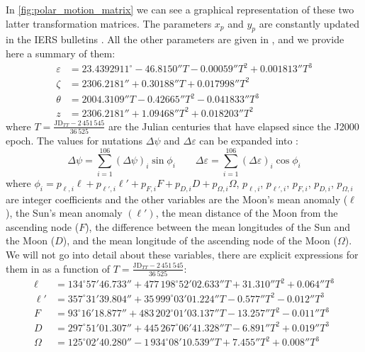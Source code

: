 \documentclass[../main.tex]{subfiles}
\begin{document}
In \cref{fig:polar_motion_matrix} we can see a graphical representation of these two latter transformation matrices. The parameters $x_p$ and $y_p$ are constantly updated in the IERS bulletins \cite{iersbulletinA}. All the other parameters are given in \cite{lieske}, and we provide here a summary of them:
\begin{align}
  \varepsilon & = 23.4392911^\circ -46.8150''T - 0.00059''T^2 + 0.001813''T^3 \\
  \zeta       & = 2306.2181''+ 0.30188''T + 0.017998''T^2                     \\
  \theta      & = 2004.3109''T- 0.42665''T^2 - 0.041833''T^3                  \\
  z           & = 2306.2181'' + 1.09468''T^2+0.018203''T^2
\end{align}
where $T=\frac{\text{JD}_{TT} - 2\,451\,545}{36\,525}$ are the Julian centuries that have elapsed since the J2000 epoch. The values for nutations $\Delta \psi$ and $\Delta \varepsilon$ can be expanded into \cite{montenbruck}:
\begin{equation}
  \Delta\psi = \sum_{i=1}^{106} {(\Delta\psi)}_i\sin \phi_i\qquad \Delta\varepsilon = \sum_{i=1}^{106} {(\Delta\varepsilon)}_i\cos \phi_i
\end{equation}
where $\phi_i=p_{\ell,i}\ell+ p_{\ell',i}\ell'+p_{F,i}F+p_{D,i}D+p_{\Omega,i}\Omega$, $p_{\ell,i}$, $p_{\ell',i}$, $p_{F,i}$, $p_{D,i}$, $p_{\Omega,i}$ are integer coefficients and the other variables are the Moon's mean anomaly ($\ell$), the Sun's mean anomaly $(\ell')$, the mean distance of the Moon from the ascending node ($F$), the difference between the mean longitudes of the Sun and the Moon ($D$), and the mean longitude of the ascending node of the Moon ($\Omega$). We will not go into detail about these variables, there are explicit expressions for them in \cite{montenbruck} as a function of $T=\frac{\text{JD}_{TT} - 2\,451\,545}{36\,525}$:
\begin{align}
  \ell   & = 134^\circ 57' 46.733'' + 477\,198^\circ 52' 02.633'' T + 31.310'' T^2 + 0.064'' T^3 \\
  \ell'  & = 357^\circ 31' 39.804'' + 35\,999^\circ 03'01.224'' T - 0.577'' T^2 - 0.012'' T^3    \\
  F      & = 93^\circ 16' 18.877'' + 483\,202^\circ 01' 03.137'' T - 13.257'' T^2 - 0.011'' T^3  \\
  D      & = 297^\circ 51' 01.307'' + 445\,267^\circ 06' 41.328'' T - 6.891'' T^2 + 0.019'' T^3  \\
  \Omega & = 125^\circ 02' 40.280'' - 1\,934^\circ 08' 10.539'' T + 7.455'' T^2 + 0.008'' T^3
\end{align}
\end{document}
